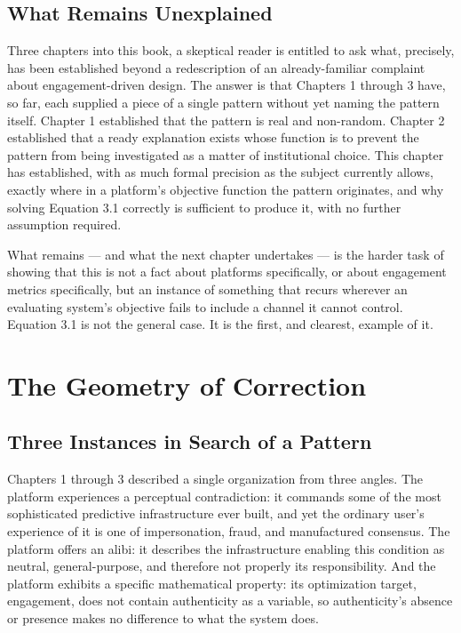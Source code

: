 \documentclass[12pt,a4paper]{book}
\begin{document}
\section{What Remains Unexplained}

Three chapters into this book, a skeptical reader is entitled to ask what, precisely, has been established beyond a redescription of an already-familiar complaint about engagement-driven design. The answer is that Chapters 1 through 3 have, so far, each supplied a piece of a single pattern without yet naming the pattern itself. Chapter 1 established that the pattern is real and non-random. Chapter 2 established that a ready explanation exists whose function is to prevent the pattern from being investigated as a matter of institutional choice. This chapter has established, with as much formal precision as the subject currently allows, exactly where in a platform's objective function the pattern originates, and why solving Equation 3.1 correctly is sufficient to produce it, with no further assumption required.

What remains — and what the next chapter undertakes — is the harder task of showing that this is not a fact about platforms specifically, or about engagement metrics specifically, but an instance of something that recurs wherever an evaluating system's objective fails to include a channel it cannot control. Equation 3.1 is not the general case. It is the first, and clearest, example of it.


\chapter{The Geometry of Correction}

\section{Three Instances in Search of a Pattern}

Chapters 1 through 3 described a single organization from three angles. The platform experiences a perceptual contradiction: it commands some of the most sophisticated predictive infrastructure ever built, and yet the ordinary user's experience of it is one of impersonation, fraud, and manufactured consensus. The platform offers an alibi: it describes the infrastructure enabling this condition as neutral, general-purpose, and therefore not properly its responsibility. And the platform exhibits a specific mathematical property: its optimization target, engagement, does not contain authenticity as a variable, so authenticity's absence or presence makes no difference to what the system does.
\end{document}

